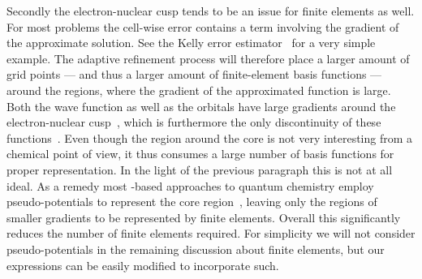 Secondly the electron-nuclear cusp tends to be an issue
for finite elements as well.
For most problems the cell-wise error contains
a term involving the gradient of the approximate solution.
See the Kelly error estimator~\cite{KellyError} for a very simple example.
The adaptive refinement process
will therefore place a larger amount of grid points
--- and thus a larger amount of finite-element basis functions ---
around the regions,
where the gradient of the approximated function is large.
Both the wave function as well as the \HF orbitals
have large gradients around the electron-nuclear cusp~\cite{Kato1957},
which is furthermore the only discontinuity of these
functions~\cite{Kato1951}.
Even though the region around the core
is not very interesting from a chemical point of view,
it thus consumes a large number of \FE basis functions
for proper representation.
In the light of the previous paragraph this is not at all ideal.
As a remedy most \FE-based approaches to quantum chemistry employ pseudo-potentials
to represent the core region~\cite{Davydov2015},
leaving only the regions of smaller gradients
to be represented by finite elements.
Overall this significantly reduces the number of finite elements required.
For simplicity we will not consider pseudo-potentials
in the remaining discussion about finite elements,
but our expressions can be easily modified to incorporate such.


